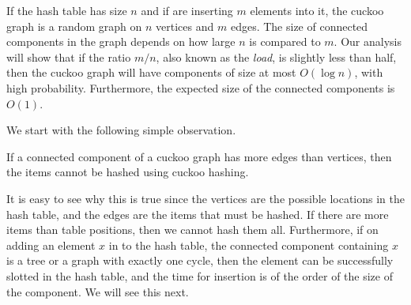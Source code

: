 If the hash table has size $n$ and if are inserting $m$ elements into it, the
cuckoo graph is a random graph on $n$ vertices and $m$ edges. The size of
connected components in the graph depends on how large $n$ is compared to
$m$. Our analysis will show that if the ratio $m/n$, also known as the
\emph{load}, is slightly less than half, then the cuckoo graph will have
components of size at most $O(\log n)$, with high probability. Furthermore, the
expected size of the connected components is $O(1)$.

We start with the following simple observation.
\begin{proposition}
  If a connected component of a cuckoo graph has more edges than vertices, then
  the items cannot be hashed using cuckoo hashing.
  \label{prop:cuckoo-more-edges}
\end{proposition}

It is easy to see why this is true since the vertices are the possible locations
in the hash table, and the edges are the items that must be hashed. If there are
more items than table positions, then we cannot hash them all. Furthermore, if
on adding an element $x$ in to the hash table, the connected component
containing $x$ is a tree or a graph with exactly one cycle, then the element can
be successfully slotted in the hash table, and the time for insertion is of the
order of the size of the component. We will see this next.


